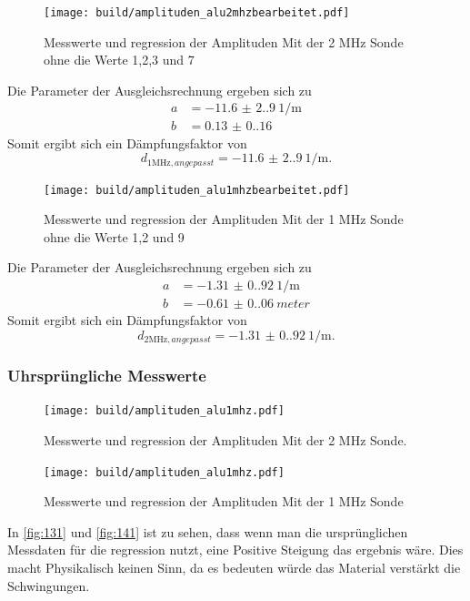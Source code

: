 \begin{figure}[H]
    \centering
    \caption{Messwerte und regression der Amplituden Mit der 2 $\unit{\mega\hertz}$ Sonde ohne die Werte 1,2,3 und 7}
    \label{fig:13}
    \texttt{[image: build/amplituden\_alu2mhzbearbeitet.pdf]}
\end{figure}
Die Parameter der Ausgleichsrechnung ergeben sich zu 
\begin{align*}
    a &= \qty{-11.6(2.9)}{1 \per\meter}\\
    b &= \qty{0.13(0.16)}{}
\end{align*}
Somit ergibt sich ein Dämpfungsfaktor von 
\begin{equation}
    d_{1\unit{\mega\hertz},angepasst} = \qty{-11.6(2.9)}{1 \per\meter}.
\end{equation}

\begin{figure}[H]
    \centering
    \caption{Messwerte und regression der Amplituden Mit der 1 $\unit{\mega\hertz}$ Sonde ohne die Werte 1,2 und 9}
    \label{fig:14}
    \texttt{[image: build/amplituden\_alu1mhzbearbeitet.pdf]}
\end{figure}
Die Parameter der Ausgleichsrechnung ergeben sich zu 
\begin{align*}
    a &= \qty{-1.31(0.92)}{1 \per\meter}\\
    b &= \qty{-0.61(0.06)}{meter}
\end{align*}
Somit ergibt sich ein Dämpfungsfaktor von 
\begin{equation}
    d_{2 \unit{\mega\hertz},angepasst} = \qty{-1.31(0.92)}{1 \per\meter}.
\end{equation}

\subsubsection{Uhrsprüngliche Messwerte}
\begin{figure}[H]
    \centering
    \caption{Messwerte und regression der Amplituden Mit der 2 $\unit{\mega\hertz}$ Sonde.}
    \label{fig:131}
    \texttt{[image: build/amplituden\_alu1mhz.pdf]}
\end{figure}
\begin{figure}[H]
    \centering
    \caption{Messwerte und regression der Amplituden Mit der 1 $\unit{\mega\hertz}$ Sonde }
    \label{fig:141}
    \texttt{[image: build/amplituden\_alu1mhz.pdf]}
\end{figure}
In \autoref{fig:131} und \autoref{fig:141} ist zu sehen, dass wenn 
man die ursprünglichen Messdaten für die regression nutzt, eine Positive Steigung 
das ergebnis wäre. Dies macht Physikalisch keinen Sinn, da es bedeuten würde das Material verstärkt die Schwingungen. 

